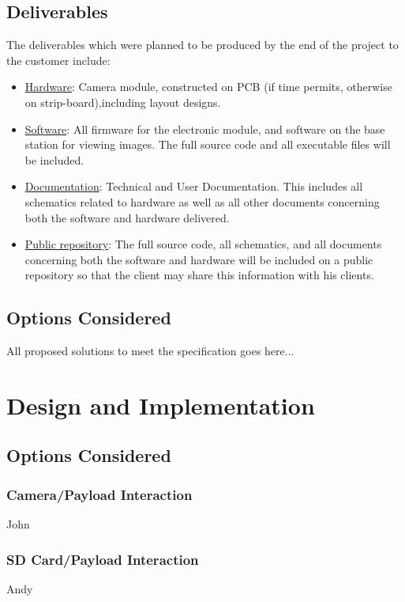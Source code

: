\documentclass[oneside]{ecsgdp}         %
\begin{document}
\section{Deliverables}
The deliverables which were planned to be produced by the end of the project to the customer include:
\begin{itemize}
	\item \underline{Hardware}: Camera module, constructed on PCB (if time permits, otherwise on strip-board),including layout designs.
	\item \underline{Software}: All firmware for the electronic module, and software on the base station for viewing images. The full source code and all executable files will be included.
	\item \underline{Documentation}: Technical and User Documentation. This includes all schematics related to hardware as well as all other documents concerning both the software and hardware delivered.
	\item \underline{Public repository}: The full source code, all schematics, and all documents concerning both the software and hardware will be included on a public repository so that the client may share this information with his clients.
\end{itemize}


\section{Options Considered}
All proposed solutions to meet the specification goes here...


\chapter{Design and Implementation}


\section{Options Considered}

\subsection{Camera/Payload Interaction}
John

\subsection{SD Card/Payload Interaction}
Andy
\end{document}
